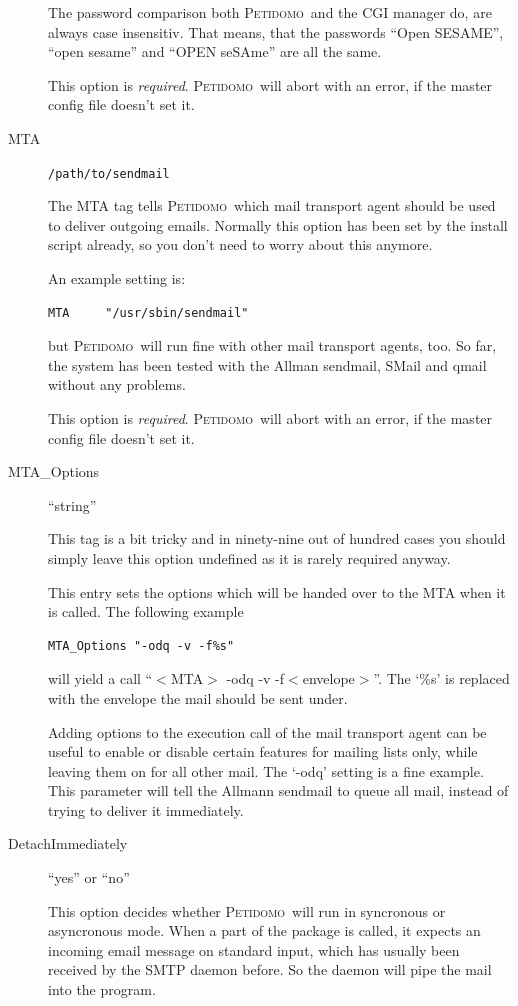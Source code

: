 \documentclass[a4paper]{report}
\newcommand{\Petidomo}{{\scshape Peti\-domo}}
\newcommand{\file}[1]{{\tt #1}}
\begin{document}
\begin{description}
The password comparison both \Petidomo\ and the CGI manager do, are
always case insensitiv. That means, that the passwords ``Open
SESAME'', ``open sesame'' and ``OPEN seSAme'' are all the same.

This option is \emph{required}. \Petidomo\ will abort with an error,
if the master config file doesn't set it.


\item[MTA] \hfill \file{/path/to/sendmail}

The MTA tag tells \Petidomo\ which mail transport agent should be used
to deliver outgoing emails. Normally this option has been set by the
install script already, so you don't need to worry about this anymore.

An example setting is:
\begin{verbatim}
MTA     "/usr/sbin/sendmail"
\end{verbatim}
but \Petidomo\ will run fine with other mail transport agents, too. So
far, the system has been tested with the Allman sendmail, SMail and
qmail without any problems.

This option is \emph{required}. \Petidomo\ will abort with an error,
if the master config file doesn't set it.


\item[MTA\_Options] \hfill ``string''

This tag is a bit tricky and in ninety-nine out of hundred cases you
should simply leave this option undefined as it is rarely required
anyway.

This entry sets the options which will be handed over to the MTA
when it is called. The following example
\begin{verbatim}
MTA_Options "-odq -v -f%s"
\end{verbatim}
will yield a call ``$<$MTA$>$ -odq -v -f$<$envelope$>$''. The `\%s' is
replaced with the envelope the mail should be sent under.

Adding options to the execution call of the mail transport agent can
be useful to enable or disable certain features for mailing lists
only, while leaving them on for all other mail. The `-odq' setting is
a fine example. This parameter will tell the Allmann sendmail to queue
all mail, instead of trying to deliver it immediately.

\item[DetachImmediately] \hfill ``yes'' or ``no''

This option decides whether \Petidomo\ will run in syncronous or
asyncronous mode. When a part of the package is called, it expects an
incoming email message on standard input, which has usually been
received by the SMTP daemon before. So the daemon will pipe the mail
into the program.


\end{description}
\end{document}
